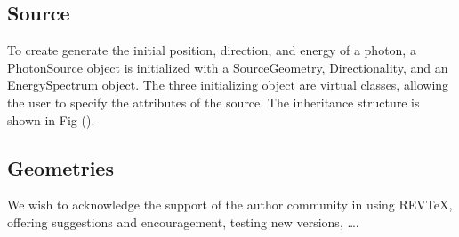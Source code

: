 \documentclass[%
 aip,
cp,  %
 amsmath,amssymb,%
reprint,%
]{revtex4-2}
\begin{document}
\subsection{Source}
    To create generate the initial position, direction, and energy of a photon, a PhotonSource object is initialized with a SourceGeometry, Directionality, and an EnergySpectrum object. The three initializing object are virtual classes, allowing the user to specify the attributes of the source. The inheritance structure is shown in Fig (). 


\subsection{Geometries}








\begin{acknowledgments}
We wish to acknowledge the support of the author community in using
REV\TeX{}, offering suggestions and encouragement, testing new versions,
\dots.
\end{acknowledgments}

\nocite{*}

\end{document}
